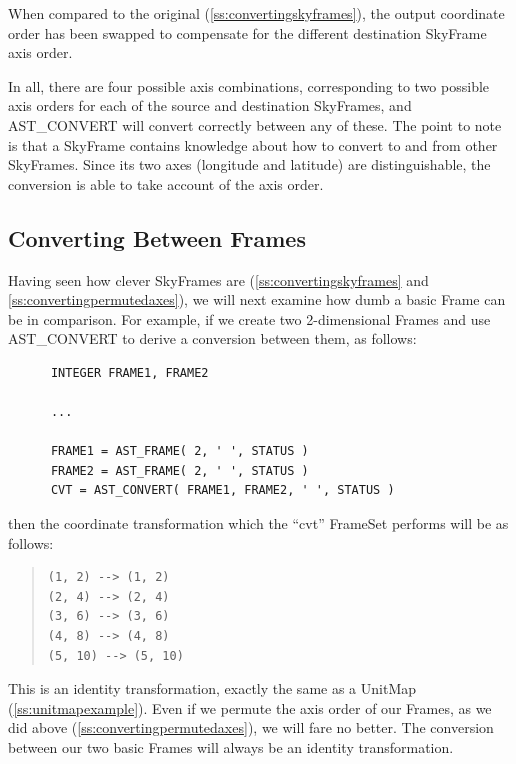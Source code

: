 \documentclass[twoside,11pt]{article}
\newcommand{\htmlref}[2]{#1}
\newcommand{\secref}[1]{\S\ref{#1}}
\renewcommand{\secref}[1]{\ref{#1}}
\begin{document}
When compared to the original (\secref{ss:convertingskyframes}), the
output coordinate order has been swapped to compensate for the
different destination SkyFrame axis order.

In all, there are four possible axis combinations, corresponding to two
possible axis orders for each of the source and destination SkyFrames,
and AST\_CONVERT will convert correctly between any of these.
The point to note is that a SkyFrame contains knowledge about how to
convert to and from other SkyFrames. Since its two axes (longitude and
latitude) are distinguishable, the conversion is able to take account
of the axis order.

\subsection{\label{ss:convertingframes}Converting Between Frames}

Having seen how clever SkyFrames are (\secref{ss:convertingskyframes}
and \secref{ss:convertingpermutedaxes}), we will next examine how dumb
a basic \htmlref{Frame}{Frame} can be in comparison. For example, if we create two
2-dimensional Frames and use \htmlref{AST\_CONVERT}{AST_CONVERT} to derive a conversion
between them, as follows:

\small
\begin{verbatim}
      INTEGER FRAME1, FRAME2

      ...

      FRAME1 = AST_FRAME( 2, ' ', STATUS )
      FRAME2 = AST_FRAME( 2, ' ', STATUS )
      CVT = AST_CONVERT( FRAME1, FRAME2, ' ', STATUS )
\end{verbatim}
\normalsize

then the coordinate transformation which the ``cvt'' \htmlref{FrameSet}{FrameSet} performs
will be as follows:

\begin{quote}
\begin{verbatim}
(1, 2) --> (1, 2)
(2, 4) --> (2, 4)
(3, 6) --> (3, 6)
(4, 8) --> (4, 8)
(5, 10) --> (5, 10)
\end{verbatim}
\end{quote}

This is an identity transformation, exactly the same as a \htmlref{UnitMap}{UnitMap}
(\secref{ss:unitmapexample}). Even if we permute the axis order of our
Frames, as we did above (\secref{ss:convertingpermutedaxes}), we will
fare no better. The conversion between our two basic Frames will
always be an identity transformation.
\end{document}
